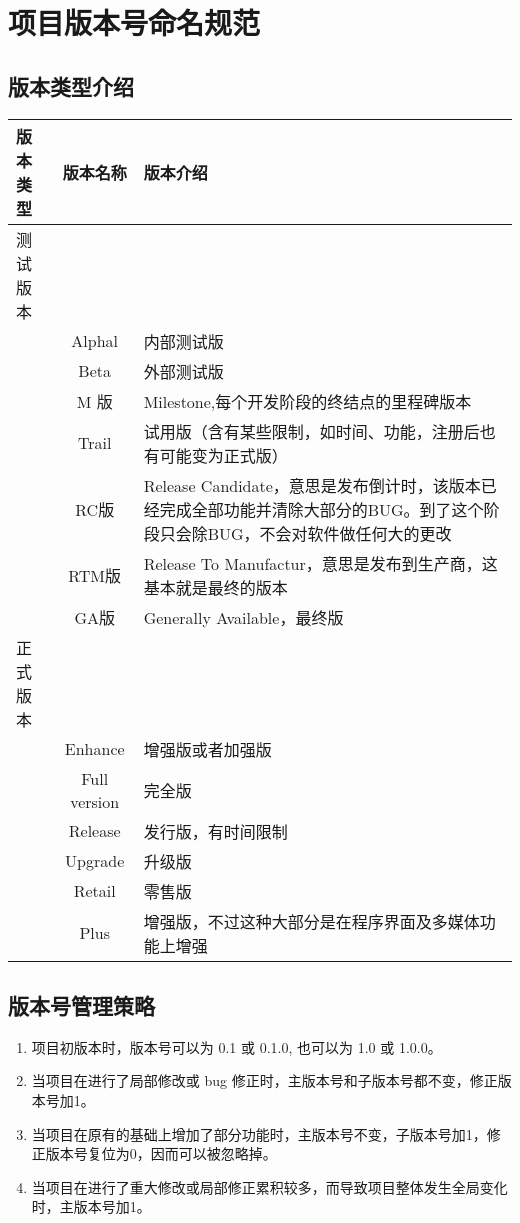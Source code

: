 \documentclass[UTF8,a4paper,12pt]{article}
\begin{document}
	\section{项目版本号命名规范}
	\subsection{版本类型介绍}
	\begin{center}
		\begin{tabular}{|l|c|p{10cm}|}  
			\hline
			版本类型 & 版本名称 & 版本介绍 \\ \hline
			测试版本 & & \\ \hline
			& Alphal & 内部测试版 \\ \hline
			& Beta & 外部测试版 \\ \hline
			& M 版 & Milestone,每个开发阶段的终结点的里程碑版本 \\ \hline
			& Trail & 试用版（含有某些限制，如时间、功能，注册后也有可能变为正式版） \\ \hline
			& RC版 & Release Candidate，意思是发布倒计时，该版本已经完成全部功能并清除大部分的BUG。到了这个阶段只会除BUG，不会对软件做任何大的更改 \\ \hline
			& RTM版 & Release To Manufactur，意思是发布到生产商，这基本就是最终的版本 \\ \hline
			& GA版 & Generally Available，最终版 \\ \hline
			正式版本 & & \\ \hline
			& Enhance & 增强版或者加强版 \\ \hline
			& Full version & 完全版 \\ \hline
			& Release & 发行版，有时间限制 \\ \hline
			& Upgrade & 升级版 \\ \hline
			& Retail & 零售版 \\ \hline
			& Plus & 增强版，不过这种大部分是在程序界面及多媒体功能上增强 \\ \hline
		\end{tabular}
	\end{center}

	\subsection{版本号管理策略}
	\begin{enumerate}
	\item 项目初版本时，版本号可以为 0.1 或 0.1.0, 也可以为 1.0 或 1.0.0。
	\item 当项目在进行了局部修改或 bug 修正时，主版本号和子版本号都不变，修正版本号加1。
	\item 当项目在原有的基础上增加了部分功能时，主版本号不变，子版本号加1，修正版本号复位为0，因而可以被忽略掉。
	\item 当项目在进行了重大修改或局部修正累积较多，而导致项目整体发生全局变化时，主版本号加1。
	\end{enumerate}
\end{document}
